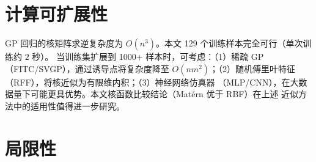 \section{计算可扩展性}\label{sec:scalability}

GP 回归的核矩阵求逆复杂度为 $O(n^{3})$。本文 129 个训练样本完全可行（单次训练约 $2$ 秒）。
当训练集扩展到 1000+ 样本时，可考虑：（1）稀疏 GP（FITC/SVGP），通过诱导点将复杂度降至
$O(nm^{2})$；（2）随机傅里叶特征（RFF），将核近似为有限维内积；（3）神经网络仿真器
（MLP/CNN），在大数据量下可能更具优势。本文核函数比较结论（Mat\'ern 优于 RBF）在上述
近似方法中的适用性值得进一步研究。

\section{局限性}\label{sec:limitations}

